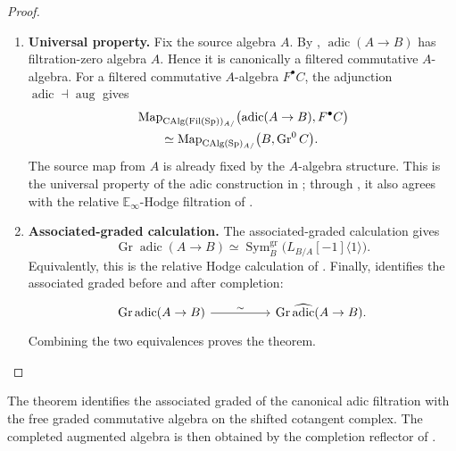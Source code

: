 \begin{proof}
\leavevmode
\begin{enumerate}[label=\textup{(\arabic*)}]
    \item \textbf{Universal property.}
    Fix the source algebra \(A\). By
    ,
    \(\operatorname{adic}(A\to B)\) has filtration-zero algebra \(A\). Hence it
    is canonically a filtered commutative \(A\)-algebra. For a filtered
    commutative \(A\)-algebra \(F^\bullet C\), the adjunction
    \(\operatorname{adic}\dashv\operatorname{aug}\) gives
    \[
    \begin{aligned}
        &\operatorname{Map}_{\operatorname{CAlg}(\operatorname{Fil}(\operatorname{Sp}))_{A/}}
        \bigl(\operatorname{adic}(A\to B),F^\bullet C\bigr)
        \\
        &\qquad\simeq
        \operatorname{Map}_{\operatorname{CAlg}(\operatorname{Sp})_{A/}}
        \bigl(B,\operatorname{Gr}^0C\bigr).
    \end{aligned}
    \]
    The source map from \(A\) is already fixed by the \(A\)-algebra structure.
    This is the universal property of the adic construction in
    \cite[Section~2]{BrantnerMagidsonNuiten}; through
    , it also agrees with the relative
    \(\mathbb E_\infty\)-Hodge filtration of
    \cite[Section~2]{AntieauFiltrationsCohomologyIII2025}.
    \item \textbf{Associated-graded calculation.}
    The associated-graded calculation
    \cite[Lemma~2.12]{BrantnerMagidsonNuiten} gives
    \[
        \operatorname{Gr}\operatorname{adic}(A\to B)
        \simeq
        \operatorname{Sym}^{\mathrm{gr}}_B
        \bigl(L_{B/A}[-1]\langle1\rangle\bigr).
    \]
    Equivalently, this is the relative Hodge calculation of
    \cite[Lemma~2.2]{AntieauFiltrationsCohomologyIII2025}. Finally,
     identifies the associated graded
    before and after completion:
    \[
    \begin{tikzcd}[column sep=huge]
        \operatorname{Gr}\operatorname{adic}(A\to B)
            \arrow[r,"\sim"]
            &
        \operatorname{Gr}\widehat{\operatorname{adic}}(A\to B).
    \end{tikzcd}
    \]
    Combining the two equivalences proves the theorem.
\end{enumerate}
\end{proof}

\begin{remark}
\label{rem:adic-associated-graded-interpretation}
The theorem identifies the associated graded of the canonical adic
filtration with the free graded commutative algebra on the shifted cotangent
complex. The completed augmented algebra is then obtained by the completion
reflector of .
\end{remark}

